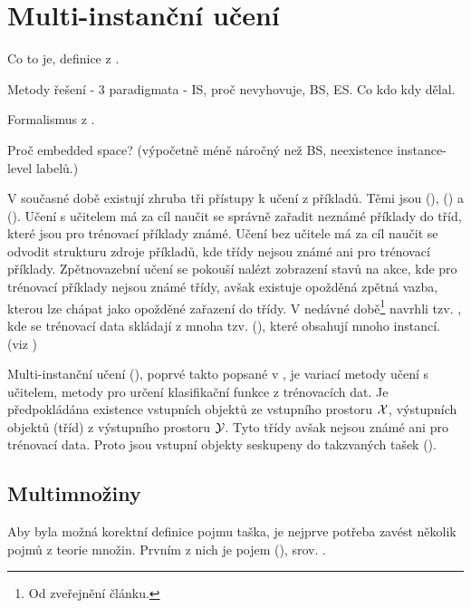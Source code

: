 \chapter{Multi-instanční učení}\label{MIL}

Co to je, definice z \cite{dietterich_solving_1997}.

Metody řešení - 3 paradigmata - IS, proč nevyhovuje, BS, ES. Co kdo kdy dělal.

Formalismus z \cite{pevny_using_2016}.

Proč embedded space? (výpočetně méně náročný než BS, neexistence instance-level labelů.)

\null

V současné době existují zhruba tři přístupy k učení z příkladů. Těmi jsou  (),  () a  (). Učení s učitelem má za cíl naučit se správně zařadit neznámé příklady do tříd, které jsou pro trénovací příklady známé. Učení bez učitele má za cíl naučit se odvodit strukturu zdroje příkladů, kde třídy nejsou známé ani pro trénovací příklady. Zpětnovazební učení se pokouší nalézt zobrazení stavů na akce, kde pro trénovací příklady nejsou známé třídy, avšak existuje opožděná zpětná vazba, kterou lze chápat jako opožděné zařazení do třídy. V nedávné době\footnote{Od zveřejnění článku.} \cite{dietterich_solving_1997} navrhli tzv. , kde se trénovací data skládají z mnoha tzv.  (), které obsahují mnoho instancí. (viz \cite{zhou_neural_2002})

Multi-instanční učení (), poprvé takto popsané v \cite{dietterich_solving_1997}, je variací metody učení s učitelem, metody pro určení klasifikační funkce z trénovacích dat. Je předpokládána existence vstupních objektů ze vstupního prostoru \( \mathcal X \), výstupních objektů (tříd) z výstupního prostoru \( \mathcal Y \). Tyto třídy avšak nejsou známé ani pro trénovací data. Proto jsou vstupní objekty seskupeny do takzvaných tašek ().

\section{Multimnožiny}

Aby byla možná korektní definice pojmu taška, je nejprve potřeba zavést několik pojmů z teorie množin. Prvním z nich je pojem  (), srov. \cite{knuth_art_1968}.

